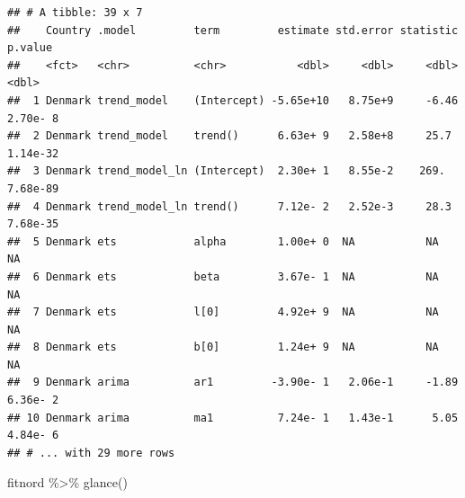 \documentclass[
]{book}
\newenvironment{Shaded}{\begin{snugshade}}{\end{snugshade}}
\newcommand{\FunctionTok}[1]{\textcolor[rgb]{0.00,0.00,0.00}{#1}}
\newcommand{\NormalTok}[1]{#1}
\newcommand{\SpecialCharTok}[1]{\textcolor[rgb]{0.00,0.00,0.00}{#1}}
\begin{document}
\begin{verbatim}
## # A tibble: 39 x 7
##    Country .model         term         estimate std.error statistic   p.value
##    <fct>   <chr>          <chr>           <dbl>     <dbl>     <dbl>     <dbl>
##  1 Denmark trend_model    (Intercept) -5.65e+10   8.75e+9     -6.46  2.70e- 8
##  2 Denmark trend_model    trend()      6.63e+ 9   2.58e+8     25.7   1.14e-32
##  3 Denmark trend_model_ln (Intercept)  2.30e+ 1   8.55e-2    269.    7.68e-89
##  4 Denmark trend_model_ln trend()      7.12e- 2   2.52e-3     28.3   7.68e-35
##  5 Denmark ets            alpha        1.00e+ 0  NA           NA    NA       
##  6 Denmark ets            beta         3.67e- 1  NA           NA    NA       
##  7 Denmark ets            l[0]         4.92e+ 9  NA           NA    NA       
##  8 Denmark ets            b[0]         1.24e+ 9  NA           NA    NA       
##  9 Denmark arima          ar1         -3.90e- 1   2.06e-1     -1.89  6.36e- 2
## 10 Denmark arima          ma1          7.24e- 1   1.43e-1      5.05  4.84e- 6
## # ... with 29 more rows
\end{verbatim}

\begin{Shaded}
\begin{Highlighting}[]
\NormalTok{fitnord }\SpecialCharTok{\%\textgreater{}\%}  \FunctionTok{glance}\NormalTok{()  }
\end{Highlighting}
\end{Shaded}
\end{document}
